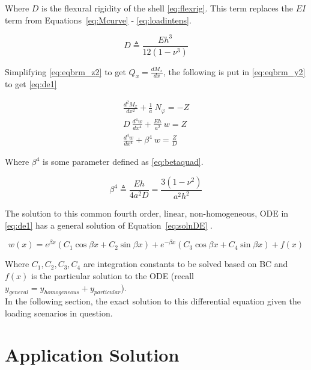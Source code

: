Where $D$ is the flexural rigidity of the shell \ref{eq:flexrig}. This term replaces the $EI$ term from Equations~\ref{eq:Mcurve} - \ref{eq:loadintens}.

\begin{equation}
	\label{eq:flexrig}
	D \triangleq \frac{Eh^3}{12(1-\nu^3)}
\end{equation}

Simplifying \ref{eq:eqbrm_z2} to get $Q_x = \frac{dM_x}{dx}$, the following is put in \ref{eq:eqbrm_y2} to get \ref{eq:de1}

\begin{equation}
	\label{eq:de1}
	\begin{aligned}
		\frac{d^2M_x}{dx^2}+\frac{1}{a} \ N_\varphi = -Z \\
		D\ \frac{d^4w}{dx^4}+\frac{Eh}{a^2} \ w = Z      \\
		\frac{d^4w}{dx^4}+\beta^4 \ w = \frac{Z}{D}      
	\end{aligned}
\end{equation} 

Where $\beta^4$ is some parameter defined as \ref{eq:betaquad}.

\begin{equation}
	\label{eq:betaquad}
	\beta^4 \triangleq \frac{Eh}{4a^2D}= \frac{3(1-\nu^2)}{a^2h^2}
\end{equation}

The solution to this common fourth order, linear, non-homogeneous, ODE in \ref{eq:de1} has a general solution of Equation~\ref{eq:solnDE} \cite{timoshenko1959theory}.

\begin{equation}
	\label{eq:solnDE}
	w(x)=e^{\beta x} \left(C_1 \cos \beta x +C_2 \sin \beta x \right)+e^{-\beta x} \left(C_3 \cos \beta x +C_4 \sin \beta x \right) +f(x)
\end{equation}

Where $ C_1, C_2, C_3, C_4$ are integration constants to be solved based on BC and $f(x)$ is the particular solution to the ODE (recall $y_{general}=y_{homogeneous}+y_{particular}$).\\

In the following section, the exact solution to this differential equation given the loading scenarios in question.


\section{Application Solution}
\label{section:3_roark}

